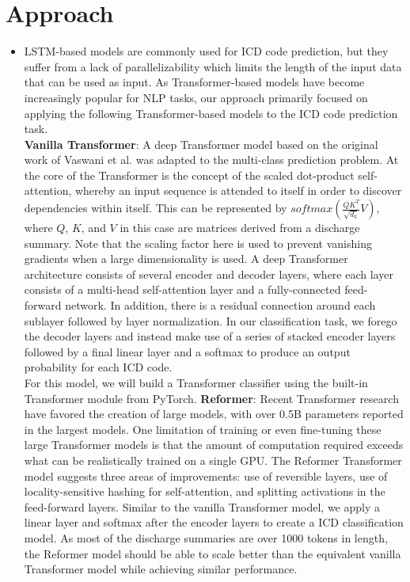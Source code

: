 \documentclass{article}
\begin{document}
\section{Approach}
\begin{itemize}
    \item
    		LSTM-based models are commonly used for ICD code prediction, but they suffer from a lack of parallelizability which limits the length of the input data that can be used as input. As Transformer-based models have become increasingly popular for NLP tasks, our approach primarily focused on applying the following Transformer-based models to the ICD code prediction task. \\
    		\textbf{Vanilla Transformer}: A deep Transformer model based on the original work of Vaswani et al. was adapted to the multi-class prediction problem. At the core of the Transformer is the concept of the scaled dot-product self-attention, whereby an input sequence is attended to itself in order to discover dependencies within itself. This can be represented by  $softmax(\frac{QK^T}{\sqrt{d_k}}V)$, where $Q$, $K$, and $V$ in this case are matrices derived from a discharge summary. Note that the scaling factor here is used to prevent vanishing gradients when a large dimensionality is used.
    		A deep Transformer architecture consists of several encoder and decoder layers, where each layer consists of a multi-head self-attention layer and a fully-connected feed-forward network. In addition, there is a residual connection around each sublayer followed by layer normalization. In our classification task, we forego the decoder layers and instead make use of a series of stacked encoder layers followed by a final linear layer and a softmax to produce an output probability for each ICD code. \\
    		For this model, we will build a Transformer classifier using the built-in Transformer module from PyTorch. 
    		\textbf{Reformer}: Recent Transformer research have favored the creation of large models, with over 0.5B parameters reported in the largest models. One limitation of training or even fine-tuning these large Transformer models is that the amount of computation required exceeds what can be realistically trained on a single GPU. The Reformer Transformer model suggests three areas of improvements: use of reversible layers, use of locality-sensitive hashing for self-attention, and splitting activations in the feed-forward layers. Similar to the vanilla Transformer model, we apply a linear layer and softmax after the encoder layers to create a ICD classification model. As most of the discharge summaries are over 1000 tokens in length, the Reformer model should be able to scale better than the equivalent vanilla Transformer model while achieving similar performance. \\

\end{itemize}
\end{document}
